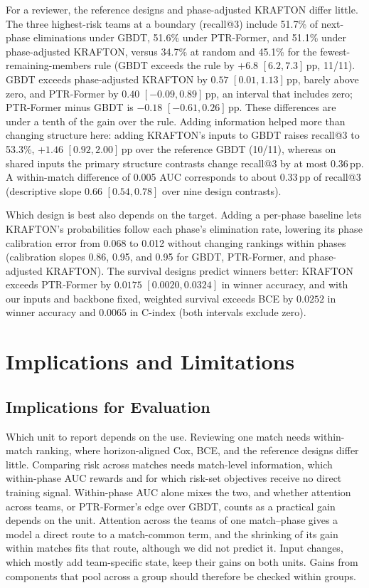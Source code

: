 \documentclass[sigconf,anonymous]{acmart}
\begin{document}
For a reviewer, the reference designs and phase-adjusted KRAFTON differ little. The three highest-risk teams at a boundary (recall@3) include 51.7\% of next-phase eliminations under GBDT, 51.6\% under PTR-Former, and 51.1\% under phase-adjusted KRAFTON, versus 34.7\% at random and 45.1\% for the fewest-remaining-members rule (GBDT exceeds the rule by $+6.8$ $[6.2,\allowbreak 7.3]$\,pp, 11/11). GBDT exceeds phase-adjusted KRAFTON by $0.57$ $[0.01,\allowbreak 1.13]$\,pp, barely above zero, and PTR-Former by $0.40$ $[-0.09,\allowbreak 0.89]$\,pp, an interval that includes zero; PTR-Former minus GBDT is $-0.18$ $[-0.61,\allowbreak 0.26]$\,pp. These differences are under a tenth of the gain over the rule. Adding information helped more than changing structure here: adding KRAFTON's inputs to GBDT raises recall@3 to 53.3\%, $+1.46$ $[0.92,\allowbreak 2.00]$\,pp over the reference GBDT (10/11), whereas on shared inputs the primary structure contrasts change recall@3 by at most 0.36\,pp. A within-match difference of 0.005 AUC corresponds to about 0.33\,pp of recall@3 (descriptive slope 0.66 $[0.54,\allowbreak 0.78]$ over nine design contrasts).

Which design is best also depends on the target. Adding a per-phase baseline lets KRAFTON's probabilities follow each phase's elimination rate, lowering its phase calibration error from 0.068 to 0.012 without changing rankings within phases (calibration slopes 0.86, 0.95, and 0.95 for GBDT, PTR-Former, and phase-adjusted KRAFTON). The survival designs predict winners better: KRAFTON exceeds PTR-Former by $0.0175$ $[0.0020,\allowbreak 0.0324]$ in winner accuracy, and with our inputs and backbone fixed, weighted survival exceeds BCE by $0.0252$ in winner accuracy and $0.0065$ in C-index (both intervals exclude zero).

\section{Implications and Limitations}
\label{sec:discussion}
\subsection{Implications for Evaluation}
\label{sec:discussion:implications}
Which unit to report depends on the use. Reviewing one match needs within-match ranking, where horizon-aligned Cox, BCE, and the reference designs differ little. Comparing risk across matches needs match-level information, which within-phase AUC rewards and for which risk-set objectives receive no direct training signal. Within-phase AUC alone mixes the two, and whether attention across teams, or PTR-Former's edge over GBDT, counts as a practical gain depends on the unit. Attention across the teams of one match--phase gives a model a direct route to a match-common term, and the shrinking of its gain within matches fits that route, although we did not predict it. Input changes, which mostly add team-specific state, keep their gains on both units. Gains from components that pool across a group should therefore be checked within groups.
\end{document}
